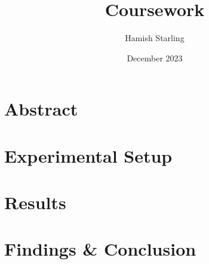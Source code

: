 \documentclass{coursework}
\title{Coursework}
\author{Hamish Starling}
\date{December 2023}
\begin{document}
\maketitle
\thispagestyle{fancy}

\section{Abstract}

\section{Experimental Setup}

\section{Results}

\section{Findings \& Conclusion}
\end{document}
